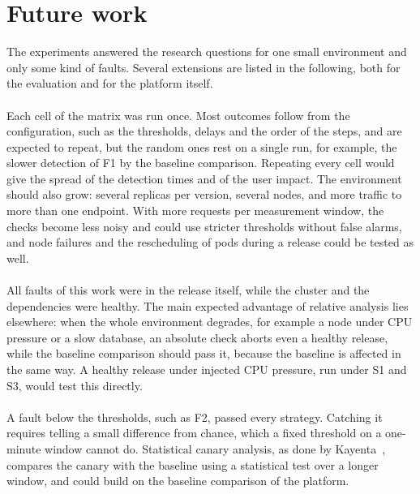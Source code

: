 \section{Future work}
\label{sec:EvalFutureWork}
The experiments answered the research questions for one small environment and only some kind of faults. Several extensions are listed in the following, both for the evaluation and for the platform itself.

\paragraph{} Each cell of the matrix was run once. Most outcomes follow from the configuration, such as the thresholds, delays and the order of the steps, and are expected to repeat, but the random ones rest on a single run, for example, the slower detection of F1 by the baseline comparison. Repeating every cell would give the spread of the detection times and of the user impact. The environment should also grow: several replicas per version, several nodes, and more traffic to more than one endpoint. With more requests per measurement window, the checks become less noisy and could use stricter thresholds without false alarms, and node failures and the rescheduling of pods during a release could be tested as well.

\paragraph{} All faults of this work were in the release itself, while the cluster and the dependencies were healthy. The main expected advantage of relative analysis lies elsewhere: when the whole environment degrades, for example a node under CPU pressure or a slow database, an absolute check aborts even a healthy release, while the baseline comparison should pass it, because the baseline is affected in the same way. A healthy release under injected CPU pressure, run under S1 and S3, would test this directly.

\paragraph{} A fault below the thresholds, such as F2, passed every strategy. Catching it requires telling a small difference from chance, which a fixed threshold on a one-minute window cannot do. Statistical canary analysis, as done by Kayenta~\cite{Kayenta}, compares the canary with the baseline using a statistical test over a longer window, and could build on the baseline comparison of the platform.

